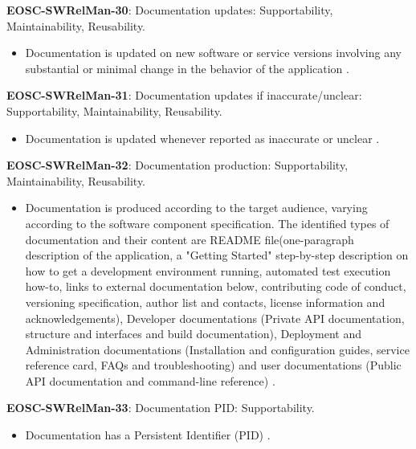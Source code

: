 \textbf{EOSC-SWRelMan-30}: Documentation updates: Supportability, Maintainability, Reusability.

\begin{itemize}
    \item Documentation is updated on new software or service versions involving any substantial or minimal change in the behavior of the application \cite{orviz_set_2017,orviz_fernandez_eosc-synergy_2020,raymond_software_2013}.
\end{itemize}

\textbf{EOSC-SWRelMan-31}: Documentation updates if inaccurate/unclear: Supportability, Maintainability, Reusability.

\begin{itemize}
    \item Documentation is updated whenever reported as inaccurate or unclear \cite{orviz_set_2017,orviz_fernandez_eosc-synergy_2020}.
\end{itemize}

\textbf{EOSC-SWRelMan-32}: Documentation production: Supportability, Maintainability, Reusability.

\begin{itemize}
    \item Documentation is produced according to the target audience, varying according to the software component specification. The identified types of documentation and their content are README file(one-paragraph description of the application, a "Getting Started" step-by-step description on how to get a development environment running, automated test execution how-to, links to external documentation below, contributing code of conduct, versioning specification, author list and contacts, license information and acknowledgements), Developer documentations (Private API documentation, structure and interfaces and build documentation), Deployment and Administration documentations (Installation and configuration guides, service reference card, FAQs and troubleshooting) and user documentations (Public API documentation and command-line reference) \cite{aberdour_achieving_2007,shepherdson_cessda_2019,orviz_set_2017,orviz_fernandez_eosc-synergy_2020,raymond_software_2013}.
\end{itemize}

\textbf{EOSC-SWRelMan-33}: Documentation PID: Supportability.

\begin{itemize}
    \item Documentation has a Persistent Identifier (PID) \cite{orviz_fernandez_eosc-synergy_2020}.
\end{itemize}

